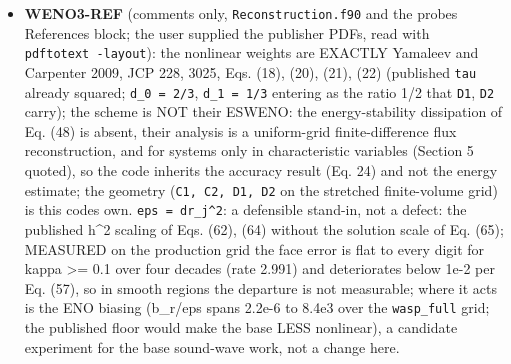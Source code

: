 \documentclass[english,a4paper]{my_memo}
\begin{document}
\begin{itemize}
  default therefore stays the whole grid, and the width is not tied to the
  thread count (the widths reach states differing by 1.5e-7 at the 1e-8
  tolerance, the thread count by 7e-14). \textbf{The remaining lag is the cell\textquotesingle s
  OWN optical depth}, which enters its own field only on the next pass
  (contraction 0.17): closing it means the cell residual carries its own
  field, \texttt{System\_HeH*}, i.e. B5. Folded: the pre-sweep \texttt{eval\_cool} run for
  its coefficients only is now \texttt{chemical\_rate\_coefficients} (-3.6 percent
  \texttt{wasp\_full}, -5.6 percent \texttt{mol\_metals}, +3.5 percent \texttt{mol\_base\_handoff},
  the last from the 27 metal slots looped with metals off: guard on
  \texttt{thereis\_metals}, HYG-COL). Recorded: \texttt{docs/openmp\_parallelization.md}
  (2.07x at 16 threads, bit-identical across threads) is stale: measured 8.2x
  and round-off 6.6e-14 (DOCS-OMP). A \texttt{cp\ -irp} of another item blocked on an
  interactive prompt since 2026-09-06 was killed by PID (23818, cwd checked).
\item
  \textbf{WENO3-REF} (comments only, \texttt{Reconstruction.f90} and the probe\textquotesingle s
  References block; the user supplied the publisher PDFs, read with
  \texttt{pdftotext\ -layout}): the nonlinear weights are EXACTLY Yamaleev and
  Carpenter 2009, JCP 228, 3025, Eqs. (18), (20), (21), (22) (published
  \texttt{tau} already squared; \texttt{d\_0\ =\ 2/3}, \texttt{d\_1\ =\ 1/3} entering as the ratio 1/2
  that \texttt{D1}, \texttt{D2} carry); the scheme is NOT their ESWENO: the energy-stability
  dissipation of Eq. (48) is absent, their analysis is a uniform-grid
  finite-difference flux reconstruction, and for systems only in
  characteristic variables (Section 5 quoted), so the code inherits the
  accuracy result (Eq. 24) and not the energy estimate; the geometry
  (\texttt{C1,\ C2,\ D1,\ D2} on the stretched finite-volume grid) is this code\textquotesingle s own.
  \texttt{eps\ =\ dr\_j\^{}2}: a defensible stand-in, not a defect: the published h\^{}2
  scaling of Eqs. (62), (64) without the solution scale of Eq. (65);
  MEASURED on the production grid the face error is flat to every digit for
  kappa \textgreater= 0.1 over four decades (rate 2.991) and deteriorates below 1e-2
  per Eq. (57), so in smooth regions the departure is not measurable; where
  it acts is the ENO biasing (b\_r/eps spans 2.2e-6 to 8.4e3 over the
  \texttt{wasp\_full} grid; the published floor would make the base LESS nonlinear),
  a candidate experiment for the base sound-wave work, not a change here.

\end{itemize}
\end{document}
